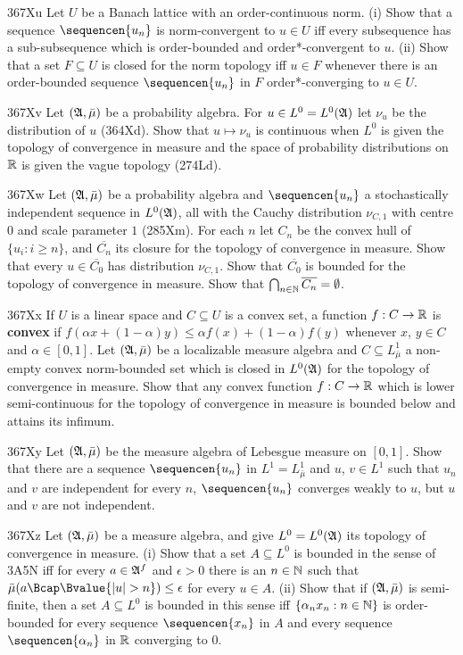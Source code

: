 {\spheader 367Xu Let $U$ be a Banach lattice with an order-continuous
norm.   (i) Show that a sequence $\sequencen{u_n}$ is norm-convergent to
$u\in U$ iff every subsequence has a sub-subsequence which is
order-bounded and order*-convergent to $u$.   (ii) Show that a set
$F\subseteq U$ is closed for
the norm topology iff $u\in F$ whenever there is an order-bounded
sequence $\sequencen{u_n}$ in $F$ order*-converging to $u\in U$.
     
\spheader 367Xv Let $(\frak A,\bar\mu)$ be a probability algebra.   For
$u\in L^0=L^0(\frak A)$ let $\nu_u$ be the distribution of $u$ (364Xd).
Show that $u\mapsto\nu_u$ is continuous when $L^0$ is given the topology
of convergence in measure and the space of probability distributions on
$\Bbb R$ is given the vague topology (274Ld).
     
\spheader 367Xw Let $(\frak A,\bar\mu)$ be a probability algebra and
$\sequencen{u_n}$ a stochastically independent sequence in
$L^0(\frak A)$, all
with the Cauchy distribution $\nu_{C,1}$ with centre $0$ and
scale parameter
$1$ (285Xm).   For each $n$ let $C_n$ be the convex hull of
$\{u_i:i\ge n\}$, and $\overline{C_n}$ its closure for the topology of
convergence in measure.   Show that every $u\in\overline{C_0}$ has
distribution $\nu_{C,1}$.      Show
that $\overline{C_0}$ is bounded for the topology of convergence in
measure.   Show that $\bigcap_{n\in\Bbb N}\overline{C_n}=\emptyset$.
     
\spheader 367Xx If $U$ is a linear space and $C\subseteq U$ is a convex
set, a function $f:C\to\Bbb R$ is {\bf convex} if
$f({\alpha}x+(1-{\alpha})y)\le {\alpha}f(x)+(1-{\alpha})f(y)$
whenever $x$, $y\in C$ and $\alpha\in[0,1]$.
Let $(\frak A,\bar\mu)$ be a localizable measure algebra and
$C\subseteq L^1_{\bar\mu}$ a non-empty convex
norm-bounded set which is closed in $L^0(\frak A)$ for the topology of
convergence in measure.   Show that any convex function $f:C\to\Bbb R$
which is lower semi-continuous for the topology of convergence in
measure is bounded below and attains its infimum.
     
\spheader 367Xy Let $(\frak A,\bar\mu)$ be the measure algebra of
Lebesgue measure on $[0,1]$.   Show that there are a sequence
$\sequencen{u_n}$ in $L^1=L^1_{\bar\mu}$ and $u$, $v\in L^1$ such
that $u_n$ and $v$ are independent for every $n$, $\sequencen{u_n}$
converges weakly to $u$, but $u$ and $v$ are not independent.

\spheader 367Xz
Let $(\frak A,\bar\mu)$ be a measure algebra, and
give $L^0=L^0(\frak A)$ its topology of convergence in measure.   
(i) Show that
a set $A\subseteq L^0$ is bounded in the sense of 3A5N iff for every
$a\in\frak A^f$ and $\epsilon>0$ there is an $n\in\Bbb N$ such that
$\bar\mu(a\Bcap\Bvalue{|u|>n})\le\epsilon$ for every $u\in A$.
(ii) Show that if $(\frak A,\bar\mu)$ is semi-finite, then a set
$A\subseteq L^0$ is bounded in this sense iff $\{\alpha_nx_n:n\in\Bbb N\}$
is order-bounded for every sequence $\sequencen{x_n}$ in $A$ and every
sequence $\sequencen{\alpha_n}$ in $\Bbb R$ converging to $0$.
     
}
